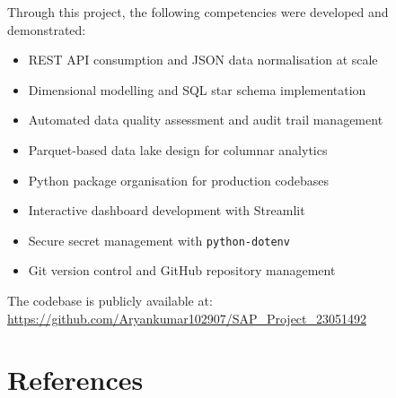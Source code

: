 \documentclass[12pt,a4paper]{report}
\begin{document}
Through this project, the following competencies were developed and demonstrated:
\begin{itemize}
  \item REST API consumption and JSON data normalisation at scale
  \item Dimensional modelling and SQL star schema implementation
  \item Automated data quality assessment and audit trail management
  \item Parquet-based data lake design for columnar analytics
  \item Python package organisation for production codebases
  \item Interactive dashboard development with Streamlit
  \item Secure secret management with \texttt{python-dotenv}
  \item Git version control and GitHub repository management
\end{itemize}

The codebase is publicly available at:\\
\url{https://github.com/Aryankumar102907/SAP_Project_23051492}

\chapter*{References}
\end{document}
